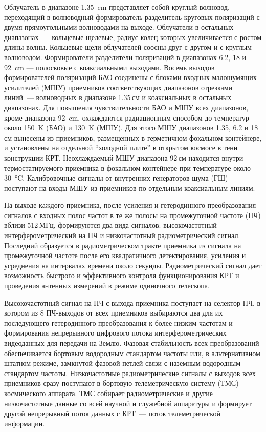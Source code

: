 Облучатель в диапазоне \SI{1.35}{\cm} представляет собой круглый волновод, переходящий в волноводный
формирователь-разделитель круговых поляризаций с двумя прямоугольными волноводами на выходе.
Облучатели в остальных диапазонах~--- кольцевые щелевые, радиус колец которых увеличивается с ростом
длины волны. Кольцевые щели облучателей соосны друг с другом и с круглым волноводом.
Формирователи-разделители поляризаций в диапазонах 6.2, 18 и \SI{92}{\cm} --- полосковые с коаксиальными
выходами. Восемь выходов формирователей поляризаций БАО соединены с блоками входных малошумящих
усилителей (МШУ) приемников соответствующих диапазонов отрезками линий~--- волноводных в диапазоне
1.35\,см и коаксиальных в остальных диапазонах. Для повышения чувствительности БАО и МШУ всех
диапазонов, кроме диапазона \SI{92}{\cm}, охлаждаются радиационным способом до температур около
\SI{150}{\kelvin} (БАО) и \SI{130}{\kelvin} (МШУ). Для этого МШУ диапазонов 1.35, 6.2 и 18\,см
вынесены из приемников, размещенных в герметичном фокальном контейнере, и установлены на отдельной
``холодной плите'' в открытом космосе в тени конструкции КРТ. Неохлаждаемый МШУ диапазона 92\,см
находится внутри термостатируемого приемника в фокальном контейнере при температуре около
\SI{30}{\degreeCelsius}. Калибровочные сигналы от внутренних генераторов шума (ГШ) поступают на
входы МШУ из приемников по отдельным коаксиальным линиям.

На выходе каждого приемника, после усиления
и гетеродинного преобразования сигналов с входных полос частот в те же полосы на промежуточной
частоте (ПЧ) вблизи 512\,МГц, формируются два
вида сигналов: высокочастотный интерферометрический на ПЧ и низкочастотный радиометрический
сигнал. Последний образуется в радиометрическом тракте приемника из сигнала на промежуточной частоте
после его квадратичного детектирования, усиления и усреднения на интервалах времени около секунды.
Радиометрический сигнал дает
возможность быстрого и эффективного контроля
функционирования КРТ и проведения антенных
измерений в режиме одиночного телескопа.

Высокочастотный сигнал на ПЧ с выхода приемника поступает на селектор ПЧ, в котором из
8 ПЧ-выходов от всех приемников выбираются
два для их последующего гетеродинного преобразования к более низким частотам и формирования
непрерывного цифрового потока интерферометрических видеоданных для передачи на Землю. Фазовая
стабильность всех преобразований обеспечивается бортовым водородным стандартом частоты
или, в альтернативном штатном режиме, замкнутой фазовой петлей связи с наземным водородным
стандартом частоты. Низкочастотные радиометрические сигналы с выходов всех приемников сразу
поступают в бортовую телеметрическую систему
(ТМС) космического аппарата. ТМС собирает радиометрические и другие низкочастотные данные
со всей научной и служебной аппаратуры и формирует другой непрерывный поток данных с КРТ~--- поток
телеметрической информации.

